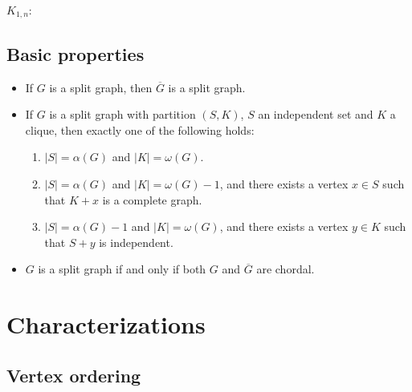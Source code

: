 \documentclass[11pt]{article}
\begin{document}
\newline
\newline
$K_{1,n}$:
\newline
\newline
{}


\subsection{Basic properties}

\begin{itemize}
	\item If $G$ is a split graph, then $\overline{G}$ is a split graph.
	\item If $G$ is a split graph with partition $(S,K)$, $S$ an independent set and $K$
		a clique, then exactly one of the following holds:
		\begin{enumerate}
			\item $|S|=\alpha(G)$ and $|K|=\omega(G)$.
			\item $|S|=\alpha(G)$ and $|K|=\omega(G)-1$, and there exists a vertex
				$x\in S$ such that $K+x$ is a complete graph.
			\item $|S|=\alpha(G)-1$ and $|K|=\omega(G)$, and there exists a vertex
				$y\in K$ such that $S+y$ is independent.
		\end{enumerate}
	\item $G$ is a split graph if and only if both $G$ and $\overline{G}$ are chordal. \cite{Golumbic}
\end{itemize}


\section{Characterizations}

\subsection{Vertex ordering}
\end{document}
